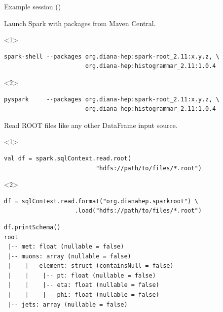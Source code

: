 \documentclass[aspectratio=169]{beamer}
\begin{document}
\begin{frame}[fragile]{Example session ()}
\vspace{0.35 cm}
\begin{center}
\begin{minipage}{0.9\linewidth}
Launch Spark with packages from Maven Central.
\small
\begin{onlyenv}<1>
\begin{verbatim}
spark-shell --packages org.diana-hep:spark-root_2.11:x.y.z, \
                       org.diana-hep:histogrammar_2.11:1.0.4
\end{verbatim}
\end{onlyenv}
\begin{onlyenv}<2>
\begin{verbatim}
pyspark     --packages org.diana-hep:spark-root_2.11:x.y.z, \
                       org.diana-hep:histogrammar_2.11:1.0.4
\end{verbatim}
\end{onlyenv}

\normalsize
Read ROOT files like any other DataFrame input source.

\small
\begin{onlyenv}<1>
\begin{verbatim}
val df = spark.sqlContext.read.root(
                          "hdfs://path/to/files/*.root")
\end{verbatim}
\end{onlyenv}
\begin{onlyenv}<2>
\begin{verbatim}
df = sqlContext.read.format("org.dianahep.sparkroot") \
                    .load("hdfs://path/to/files/*.root")
\end{verbatim}
\end{onlyenv}

\vspace{-0.5 cm}
\small
\begin{verbatim}
df.printSchema()
root
 |-- met: float (nullable = false)
 |-- muons: array (nullable = false)
 |    |-- element: struct (containsNull = false)
 |    |    |-- pt: float (nullable = false)
 |    |    |-- eta: float (nullable = false)
 |    |    |-- phi: float (nullable = false)
 |-- jets: array (nullable = false)
\end{verbatim}
\end{minipage}
\end{center}
\end{frame}
\end{document}
